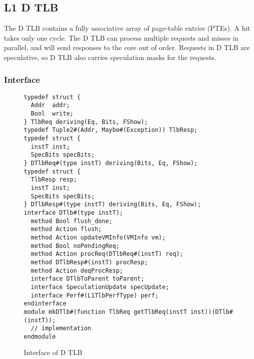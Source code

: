 \subsection{L1 D TLB}
The D TLB contains a fully associative array of page-table entries (PTEs).
A hit takes only one cycle.
The D TLB can process multiple requests and misses in parallel, and will send responses to the core out of order.
Requests in D TLB are speculative, so D TLB also carries speculation masks for the requests.

\subsubsection{Interface}

\begin{figure}
\begin{lstlisting}[caption={}]
typedef struct {
  Addr  addr;
  Bool  write;
} TlbReq deriving(Eq, Bits, FShow);
typedef Tuple2#(Addr, Maybe#(Exception)) TlbResp;
typedef struct {
  instT inst;
  SpecBits specBits;
} DTlbReq#(type instT) deriving(Bits, Eq, FShow);
typedef struct {
  TlbResp resp;
  instT inst;
  SpecBits specBits;
} DTlbResp#(type instT) deriving(Bits, Eq, FShow);
interface DTlb#(type instT);
  method Bool flush_done;
  method Action flush;
  method Action updateVMInfo(VMInfo vm);
  method Bool noPendingReq;
  method Action procReq(DTlbReq#(instT) req);
  method DTlbResp#(instT) procResp;
  method Action deqProcResp;
  interface DTlbToParent toParent;
  interface SpeculationUpdate specUpdate;
  interface Perf#(L1TlbPerfType) perf;
endinterface
module mkDTlb#(function TlbReq getTlbReq(instT inst))(DTlb#(instT));
  // implementation
endmodule
\end{lstlisting}
\caption{Interface of D TLB}\label{fig:d-tlb-ifc}
\end{figure}

